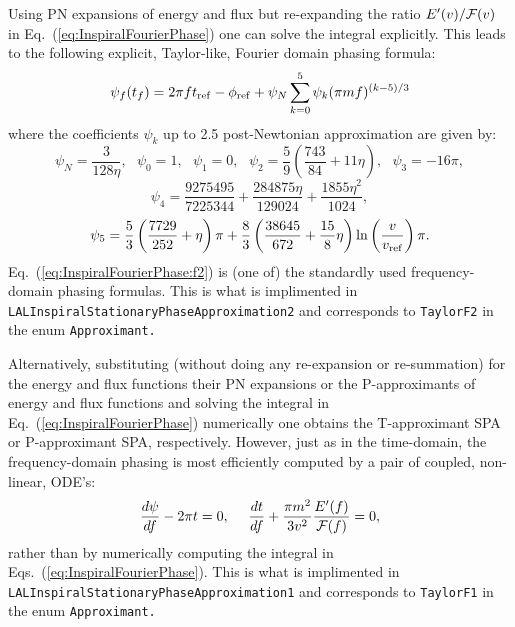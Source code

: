 Using PN expansions of energy and flux but
re-expanding the ratio $E'(v)/{\cal F}(v)$ in Eq.~(\ref{eq:InspiralFourierPhase}) one
can solve the integral explicitly. This leads to the following
explicit, Taylor-like, Fourier domain phasing formula:
\begin{equation}
 \psi_f(t_f) = 2 \pi f t_{\rm ref} - \phi_{\rm ref} + 
 \psi_N \sum_{k=0}^5 {\psi}_k (\pi m f)^{(k-5)/3} 
\label{eq:InspiralFourierPhase:f2}
\end{equation}
where the coefficients ${\psi}_k$ up to 2.5 post-Newtonian approximation are given by:
$$\psi_N =  \frac{3}{128\eta},\ \ \ \psi_0 = 1,\ \ \ \psi_1 = 0,\ \ \   
\psi_2 =  \frac{5}{9} \left ( \frac{743}{84} + 11\eta\right ),\ \ \ 
\psi_3 =  -16\pi,$$
$$\psi_4 =  \frac{9275495}{7225344}+\frac{284875\eta}{129024 } + \frac{1855\eta^2}{1024},$$
$$\psi_5 =  \frac{5}{3} \left ( \frac{7729}{252} + \eta \right ) \pi +
   \frac{8}{3} \left ( \frac{38645}{672} + \frac{15}{8} \eta \right ) 
	\ln \left ( \frac{v}{v_{\rm ref}} \right )\pi.$$
Eq.~(\ref{eq:InspiralFourierPhase:f2}) is (one of) the  standardly used frequency-domain phasing formulas.
This is what is implimented in {\tt LALInspiralStationaryPhaseApproximation2}
and corresponds to \texttt{TaylorF2} in the enum \texttt{Approximant.}

Alternatively, substituting (without doing any re-expansion or re-summation) 
for the energy and flux functions their PN expansions
or the P-approximants of energy and flux functions 
and solving the integral in Eq.~(\ref{eq:InspiralFourierPhase}) numerically
one obtains the T-approximant SPA or P-approximant SPA, respectively.
However, just as in the time-domain, the frequency-domain phasing is 
most efficiently computed by a pair of coupled, non-linear, ODE's:
\begin{equation}
\frac{d\psi}{df} - 2\pi t = 0, \ \ \ \
\frac{dt}{df} + \frac{\pi m^2}{3v^2} \frac{E'(f)}{{\cal F}(f)} = 0,
\label {eq:frequencyDomainODE}
\end{equation}
rather  than by numerically computing the integral in  
Eqs.~(\ref{eq:InspiralFourierPhase}).
This is what is implimented in {\tt LALInspiralStationaryPhaseApproximation1}
and corresponds to \texttt{TaylorF1} in the enum \texttt{Approximant.}

